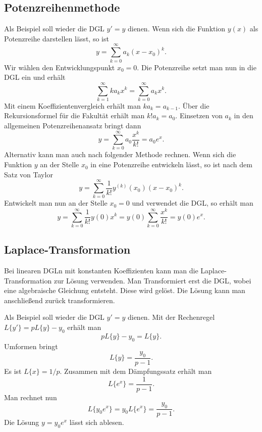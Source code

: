 \documentclass[a4paper,10pt,fleqn,twocolumn,twoside,openany]{article}
\numberwithin{equation}{section}
\theoremstyle{definition}
\begin{document}
\subsection{Potenzreihenmethode}

Als Beispiel soll wieder die DGL $y'=y$ dienen.
Wenn sich die Funktion $y(x)$ als Potenzreihe darstellen lässt, so ist
\begin{equation}
y=\sum_{k=0}^\infty a_k(x-x_0)^k.
\end{equation}
Wir wählen den Entwicklungspunkt $x_0=0$. Die Potenzreihe setzt man
nun in die DGL ein und erhält
\begin{equation}
\sum_{k=1}^\infty ka_kx^k = \sum_{k=0}^\infty a_kx^k.
\end{equation}
Mit einem Koeffizientenvergleich erhält man $ka_k=a_{k-1}$.
Über die Rekursionsformel für die Fakultät erhält man $k!a_k=a_0$.
Einsetzen von $a_k$ in den allgemeinen Potenzreihenansatz bringt dann
\begin{equation}
y=\sum_{k=0}^\infty a_0\frac{x^k}{k!} = a_0e^x.
\end{equation}
Alternativ kann man auch nach folgender Methode rechnen.
Wenn sich die Funktion $y$ an der Stelle $x_0$ in eine Potenzreihe
entwickeln lässt, so ist nach dem Satz von Taylor
\begin{equation}
y = \sum_{k=0}^\infty \frac{1}{k!}y^{(k)}(x_0)(x-x_0)^k.
\end{equation}
Entwickelt man nun an der Stelle $x_0=0$ und verwendet die DGL,
so erhält man
\begin{equation}
y = \sum_{k=0}^\infty \frac{1}{k!}y(0)x^k
= y(0)\sum_{k=0}^\infty \frac{x^k}{k!}
= y(0)e^x.
\end{equation}

\subsection{Laplace-Transformation}

Bei linearen DGLn mit konstanten Koeffizienten kann man die
Laplace-Transformation zur Lösung verwenden. Man Transformiert
erst die DGL, wobei eine algebraische Gleichung entsteht. Diese
wird gelöst. Die Lösung kann man anschließend zurück transformieren.

Als Beispiel soll wieder die DGL $y'=y$ dienen. Mit der Rechenregel
$L\{y'\} = pL\{y\}-y_0$ erhält man
\begin{equation}
pL\{y\}-y_0 = L\{y\}.
\end{equation}
Umformen bringt
\begin{equation}
L\{y\} = \frac{y_0}{p-1}.
\end{equation}
Es ist $L\{x\} = 1/p$. Zusammen mit dem Dämpfungssatz erhält man
\begin{equation}
L\{e^x\} = \frac{1}{p-1}.
\end{equation}
Man rechnet nun
\begin{equation}
L\{y_0e^x\} = y_0L\{e^x\} = \frac{y_0}{p-1}.
\end{equation}
Die Lösung $y=y_0e^x$ lässt sich ablesen.
\end{document}
